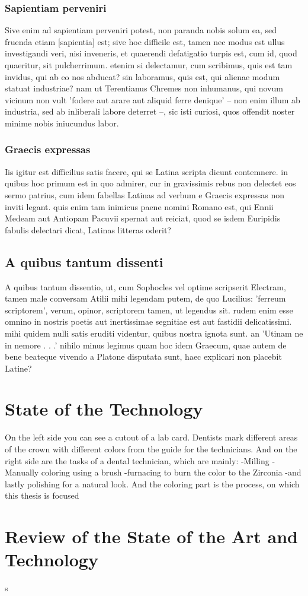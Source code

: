 \subsection{Sapientiam perveniri}
Sive enim ad sapientiam perveniri potest, non paranda nobis solum ea, sed fruenda etiam [sapientia] est; sive hoc difficile est, tamen nec modus est ullus investigandi veri, nisi inveneris, et quaerendi defatigatio turpis est, cum id, quod quaeritur, sit pulcherrimum. etenim si delectamur, cum scribimus, quis est tam invidus, qui ab eo nos abducat? sin laboramus, quis est, qui alienae modum statuat industriae? nam ut Terentianus Chremes non inhumanus, qui novum vicinum non vult 'fodere aut arare aut aliquid ferre denique' -- non enim illum ab industria, sed ab inliberali labore deterret --, sic isti curiosi, quos offendit noster minime nobis iniucundus labor.

\subsection{Graecis expressas}
\label{sec:freiheitsgrad_eines_getriebes}
Iis igitur est difficilius satis facere, qui se Latina scripta dicunt contemnere. in quibus hoc primum est in quo admirer, cur in gravissimis rebus non delectet eos sermo patrius, cum idem fabellas Latinas ad verbum e Graecis expressas non inviti legant. quis enim tam inimicus paene nomini Romano est, qui Ennii Medeam aut Antiopam Pacuvii spernat aut reiciat, quod se isdem Euripidis fabulis delectari dicat, Latinas litteras oderit?



\section{A quibus tantum dissenti}
\label{sec:grundlagen_für_die_kinematischen_betrachtungen}
A quibus tantum dissentio, ut, cum Sophocles vel optime scripserit Electram, tamen male conversam Atilii mihi legendam putem, de quo Lucilius: 'ferreum scriptorem', verum, opinor, scriptorem tamen, ut legendus sit. rudem enim esse omnino in nostris poetis aut inertissimae segnitiae est aut fastidii delicatissimi. mihi quidem nulli satis eruditi videntur, quibus nostra ignota sunt. an 'Utinam ne in nemore . . .' nihilo minus legimus quam hoc idem Graecum, quae autem de bene beateque vivendo a Platone disputata sunt, haec explicari non placebit Latine?

\chapter{State of the Technology}
\label{sec:stand_technik}
On the left side you can see a cutout of a lab card. Dentists mark different areas of the crown with different colors from the guide for the technicians.
And on the right side are the tasks of a dental technician, which are mainly:
-Milling 
-Manually coloring using a brush
-furnacing to burn the color to the Zirconia
-and lastly polishing for a natural look.
And the coloring part is the process, on which this thesis is focused 


\chapter{Review of the State of the Art and Technology}
\label{sec:kritik_stand_technik}
s